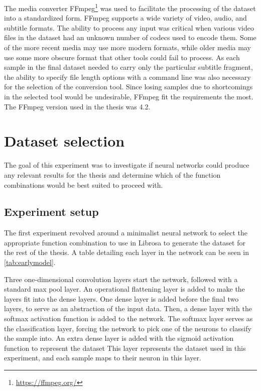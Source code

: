 The media converter FFmpeg\footnote{\url{https://ffmpeg.org/}} was used to facilitate the processing of the dataset into a standardized form.
FFmpeg supports a wide variety of video, audio, and subtitle formats.
The ability to process any input was critical when various video files in the dataset had an unknown number of codecs used to encode them.
Some of the more recent media may use more modern formats, while older media may use some more obscure format that other tools could fail to process.
As each sample in the final dataset needed to carry only the particular subtitle fragment, the ability to specify file length options with a command line was also necessary for the selection of the conversion tool.
Since losing samples due to shortcomings in the selected tool would be undesirable, FFmpeg fit the requirements the most.
The FFmpeg version used in the thesis was 4.2.



\section{Dataset selection}
\label{ex:dataset}

The goal of this experiment was to investigate if neural networks could produce any relevant results for the thesis and determine which of the function combinations would be best suited to proceed with.
\subsection{Experiment setup}
The first experiment revolved around a minimalist neural network to select the appropriate function combination to use in Librosa to generate the dataset for the rest of the thesis.
A table detailing each layer in the network can be seen in \cref{tab:earlymodel}.

Three one-dimensional convolution layers start the network, followed with a standard max pool layer.
An operational flattening layer is added to make the layers fit into the dense layers.
One dense layer is added before the final two layers, to serve as an abstraction of the input data.
Then, a dense layer with the softmax activation function is added to the network.
The softmax layer serves as the classification layer, forcing the network to pick one of the neurons to classify the sample into.
An extra dense layer is added with the sigmoid activation function to represent the dataset
This layer represents the dataset used in this experiment, and each sample maps to their neuron in this layer.

